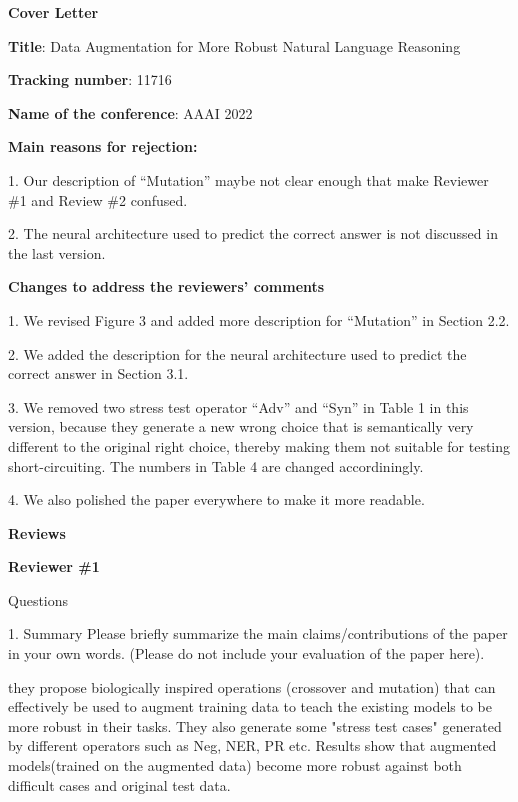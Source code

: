 \documentclass{article}
\begin{document}

\begin{center}
\textbf{\LARGE{Cover Letter}}
\vspace{1cm}
\end{center}
\textbf{Title}: Data Augmentation for More Robust Natural Language Reasoning

\textbf{Tracking number}: 11716 

\textbf{Name of the conference}: AAAI 2022

\textbf{Main reasons for rejection:}

1. Our description of ``Mutation'' maybe not clear enough that make Reviewer \#1 and Review \#2 confused. 

2. The neural architecture used to predict the correct answer is not discussed in the last version.

\textbf{Changes to address the reviewers’ comments} 

1. We revised Figure 3 and added more description for ``Mutation'' in Section 2.2.

2. We added the description for the neural architecture used to predict the correct answer in Section 3.1.

3. We removed two stress test operator ``Adv'' and ``Syn'' in Table 1 in this version, 
because they generate a new wrong choice that is semantically very different to 
the original right choice, thereby making them not suitable for testing short-circuiting. The numbers in 
Table 4 are changed accordiningly. 

4. We also polished the paper everywhere to make it more readable.



\begin{center}
\vspace{1cm}
\textbf{\LARGE{Reviews}}
\vspace{1cm}
\end{center}

\textbf{\Large{Reviewer \#1}}

Questions

1. {Summary} Please briefly summarize the main claims/contributions of the paper in your own words. (Please do not include your evaluation of the paper here).

they propose biologically inspired operations (crossover and mutation) that can effectively be used to augment training data to teach the existing models to be more robust in their tasks. They also generate some "stress test cases" generated by different operators such as Neg, NER, PR etc. Results show that augmented models(trained on the augmented data) become more robust against both difficult cases and original test data.
\end{document}
